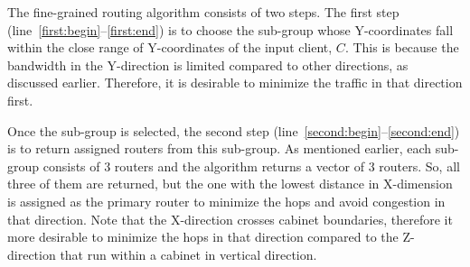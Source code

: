 The fine-grained routing algorithm consists of two steps. The first step
(line~\ref{first:begin}--\ref{first:end}) is to choose the sub-group whose
Y-coordinates fall within the close range of Y-coordinates of the input client,
$C$. This is because the bandwidth in the Y-direction is limited compared to
other directions, as discussed earlier. Therefore, it is desirable to minimize
the traffic in that direction first. 

Once the sub-group is selected, the second step
(line~\ref{second:begin}--\ref{second:end}) is to return assigned routers from
this sub-group. As mentioned earlier, each sub-group consists of 3 routers and
the algorithm returns a vector of 3 routers. So, all three of them are
returned, but the one with the lowest distance in X-dimension is assigned as
the primary router to minimize the hops and avoid congestion in that direction.
Note that the X-direction crosses cabinet boundaries, therefore it more
desirable to minimize the hops in that direction compared to the Z-direction
that run within a cabinet in vertical direction.


